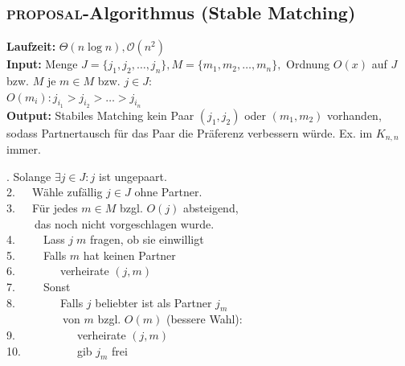 \documentclass[10pt,a4paper,ngerman,oneside,]{article}
\begin{document}
\begin{multicols}{2}
\subsection{\textsc{proposal}-Algorithmus (Stable Matching)}
\textbf{Laufzeit:} $\Theta(n\log n),\mathcal{O}(n^2)$\\
\textbf{Input:} Menge $J=\{j_1,j_2,\dots,j_n\}, M=\{m_1,m_2,\dots,m_n\},$ Ordnung $O(x)$ auf $J$ bzw. $M$ je $m\in M$ bzw. $j\in J$: \\$O(m_i): j_{i_1}>j_{i_2}>\dots > j_{i_n}$\\
\textbf{Output:} Stabiles Matching kein Paar $(j_1,j_2)$ oder $(m_1,m_2)$ vorhanden, sodass Partnertausch für das Paar die Präferenz verbessern würde. Ex. im $K_{n,n}$ immer.
\begin{flushleft}
. Solange $\exists j\in J: j $ ist ungepaart. \\
2.~~~Wähle zufällig $j\in J$ ohne Partner.\\
3.~~~Für jedes $m\in M$ bzgl. $O(j)$ absteigend,\\
~~~~~das noch nicht vorgeschlagen wurde. \\
4.~~~~~Lass $j\;m$ fragen, ob sie einwilligt\\
5.~~~~~Falls $m$ hat keinen Partner\\
6.~~~~~~~~verheirate $(j,m)$\\
7.~~~~~Sonst\\
8.~~~~~~~~Falls $j$ beliebter ist als Partner $j_m$\\
~~~~~~~~~~von $m$ bzgl. $O(m)$ (bessere Wahl):\\
9.~~~~~~~~~~~verheirate $(j,m)$\\
10.~~~~~~~~~~gib $j_m$ frei\\ 
\end{flushleft}

\end{multicols}
\end{document}

